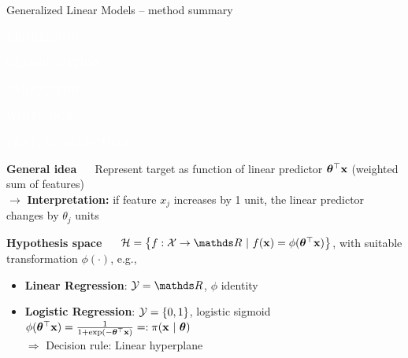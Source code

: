 \documentclass[11pt,compress,t,notes=noshow, xcolor=table]{beamer}
\newcommand{\highlight}[1]{\textcolor{hlcol}{\textbf{#1}}}
\newcommand{\maketag}[2][100]{
  \colorbox{hlcol!#1}{\textcolor{white}{\MakeUppercase{\scriptsize #2}} 
  \vphantom{}}
}
\begin{document}
\begin{frame2}{Generalized Linear Models -- method summary}
  \maketag{regression} \maketag{classification} \maketag{PARAMETRIC} 
\maketag{WHITE-BOX} \maketag[50]{Feature selection}

\highlight{General idea} ~~ Represent target as function of linear predictor
$\bm{\theta}^\top \mathbf{x}$ (weighted sum of features)\\
$\rightarrow$ \textbf{Interpretation:} if feature $x_j$ increases by 1 unit, the linear predictor changes by $\theta_j$ units

\highlight{Hypothesis space} ~~
$\Hspace = \left\{f: \Xspace \to \R ~|~\fx = \phi(\thetav^\top \xv)\right\}$, 
with suitable transformation $\phi(\cdot)$, e.g.,

\begin{itemize}
  \item \textbf{Linear Regression}: $\Yspace = \R$, $\phi$ identity
  \item \textbf{Logistic Regression}: $\mathcal{Y} = \{0, 1\}$, logistic sigmoid $\phi(\bm{\theta}^\top \mathbf{x}) = \frac{1}{1 + \exp(- \bm{\theta}^\top \mathbf{x})} 
  =: \pi(\mathbf{x}~|~ \bm{\theta})$\\
  $\Rightarrow$ Decision rule: Linear hyperplane
\end{itemize}
\end{frame2}
\end{document}
